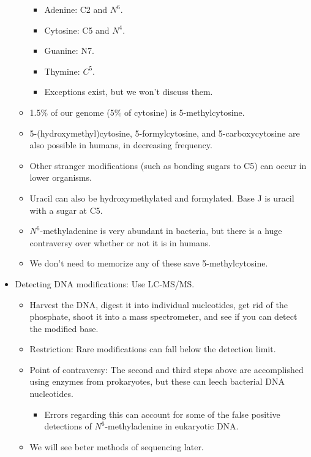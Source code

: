 \documentclass[../notes.tex]{subfiles}
\begin{document}
\begin{itemize}
\begin{itemize}
        \begin{itemize}
            \item Adenine: C2 and $N^6$.
            \item Cytosine: C5 and $N^4$.
            \item Guanine: N7.
            \item Thymine: $C^5$.
            \item Exceptions exist, but we won't discuss them.
        \end{itemize}
        \item 1.5\% of our genome (5\% of cytosine) is 5-methylcytosine.
        \item 5-(hydroxymethyl)cytosine, 5-formylcytosine, and 5-carboxycytosine are also possible in humans, in decreasing frequency.
        \item Other stranger modifications (such as bonding sugars to C5) can occur in lower organisms.
        \item Uracil can also be hydroxymethylated and formylated. Base J is uracil with a sugar at C5.
        \item $N^6$-methyladenine is very abundant in bacteria, but there is a huge contraversy over whether or not it is in humans.
        \item We don't need to memorize any of these save 5-methylcytosine.
    \end{itemize}
    \item Detecting DNA modifications: Use LC-MS/MS.
    \begin{itemize}
        \item Harvest the DNA, digest it into individual nucleotides, get rid of the phosphate, shoot it into a mass spectrometer, and see if you can detect the modified base.
        \item Restriction: Rare modifications can fall below the detection limit.
        \item Point of contraversy: The second and third steps above are accomplished using enzymes from prokaryotes, but these can leech bacterial DNA nucleotides.
        \begin{itemize}
            \item Errors regarding this can account for some of the false positive detections of $N^6$-methyladenine in eukaryotic DNA.
        \end{itemize}
        \item We will see beter methods of sequencing later.
    \end{itemize}

\end{itemize}
\end{document}
